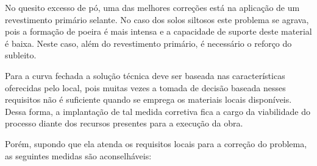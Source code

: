 
 No quesito excesso de pó, uma das melhores correções está na aplicação de um revestimento primário selante. No caso dos solos siltosos este problema se agrava, pois a formação de poeira é mais intensa e a capacidade de suporte deste material é baixa. Neste caso, além do revestimento primário, é necessário o reforço do subleito.
 
 Para a curva fechada a solução técnica deve ser baseada nas características oferecidas pelo local, pois muitas vezes a tomada de decisão baseada nesses requisitos não é suficiente quando se emprega os materiais locais disponíveis. Dessa forma, a implantação de tal medida corretiva fica a cargo da viabilidade do processo diante dos recursos presentes para a execução da obra.
 
 Porém, supondo que ela atenda os requisitos locais para a correção do problema, as seguintes medidas são aconselháveis: 